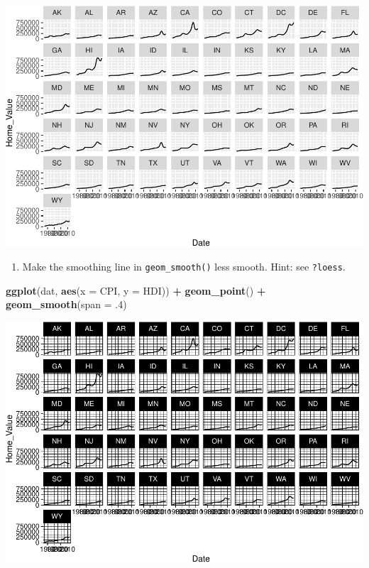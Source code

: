 \documentclass[
]{book}
\newenvironment{Shaded}{\begin{snugshade}}{\end{snugshade}}
\newcommand{\DataTypeTok}[1]{\textcolor[rgb]{0.13,0.29,0.53}{#1}}
\newcommand{\FloatTok}[1]{\textcolor[rgb]{0.00,0.00,0.81}{#1}}
\newcommand{\KeywordTok}[1]{\textcolor[rgb]{0.13,0.29,0.53}{\textbf{#1}}}
\newcommand{\NormalTok}[1]{#1}
\newcommand{\OperatorTok}[1]{\textcolor[rgb]{0.81,0.36,0.00}{\textbf{#1}}}
\newcommand{\StringTok}[1]{\textcolor[rgb]{0.31,0.60,0.02}{#1}}
\providecommand{\tightlist}{%
  \setlength{\itemsep}{0pt}\setlength{\parskip}{0pt}}
\begin{document}
\begin{alert}
\includegraphics{R/Rgraphics/figures/unnamed-chunk-178-1.pdf}

\begin{enumerate}
\def\labelenumi{\arabic{enumi}.}
\setcounter{enumi}{2}
\tightlist
\item
  Make the smoothing line in \texttt{geom\_smooth()} less smooth. Hint: see \texttt{?loess}.
\end{enumerate}

\begin{Shaded}
\begin{Highlighting}[]
\KeywordTok{ggplot}\NormalTok{(dat, }\KeywordTok{aes}\NormalTok{(}\DataTypeTok{x =}\NormalTok{ CPI, }\DataTypeTok{y =}\NormalTok{ HDI)) }\OperatorTok{+}
\StringTok{  }\KeywordTok{geom\_point}\NormalTok{() }\OperatorTok{+}
\StringTok{  }\KeywordTok{geom\_smooth}\NormalTok{(}\DataTypeTok{span =} \FloatTok{.4}\NormalTok{)}
\end{Highlighting}
\end{Shaded}

\includegraphics{R/Rgraphics/figures/unnamed-chunk-179-1.pdf}


\end{alert}
\end{document}
